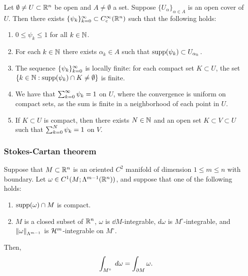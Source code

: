 \documentclass[a4paper]{article}
\begin{document}
\begin{thm}
Let $\emptyset \neq U \subset \mathbb{R}^n$ be open and $A \neq 
\emptyset$ a set. Suppose $\{U_\alpha\}_{\alpha \in A}$
is an open cover of $U$. Then there exists 
$\{ \psi_k \}_{k=0}^\infty \subset C_c^\infty (\mathbb{R}^n)$ such that 
the following holds: 
\begin{enumerate}
\item $0 \leq \psi_k \leq 1$ for all $k \in \mathbb{N}$. 

\item For each $k \in \mathbb{N}$ there exists $\alpha_k \in A$
such that $\operatorname{supp} (\psi_k) \subset U_{\alpha_k}$.

\item The sequence $\{ \psi_k \}_{k=0}^\infty$ is locally finite: 
for each compact set $K \subset U$, the set 
$\{k \in \mathbb{N}: \operatorname{supp}(\psi_k) \cap K \neq \emptyset\}$
is finite.

\item We have that $\sum_{k=0}^\infty \psi_k = 1$
on $U$, where the convergence is uniform on compact sets, as
the sum is finite in a neighborhood of each point in $U$.

\item If $K \subset U$ is compact, then there exists $N \in \mathbb{N}$
and an open set $K \subset V \subset U$ such that 
$\sum_{k=0}^N \psi_k = 1$ on $V$.
\end{enumerate}
\end{thm}

\subsubsection{Stokes-Cartan theorem}

\begin{thm}
Suppose that $M \subset \mathbb{R}^n$ is an oriented $C^2$ manifold
of dimension $1 \leq m \leq n$ with boundary. Let $\omega
\in C^1 (M; \Lambda^{m-1} (\mathbb{R}^n))$, and suppose that one of
the following holds:
\begin{enumerate}
  \item $\operatorname{supp} (\omega) \cap M$ is compact.
  \item $M$ is a closed subset of $\mathbb{R}^n$, $\omega$ is
  $\dd M$-integrable, $d \omega$ is $M^\circ$-integrable,
  and $\left\lVert \omega\right\rVert_{\Lambda^{m-1}}$ is $\mathcal{H}^m$-integrable
  on $M^\circ$.
\end{enumerate}
Then,
\[
\int_{M^\circ} \; d \omega = \int_{\partial M} \omega.
\]
\end{thm}
\end{document}
